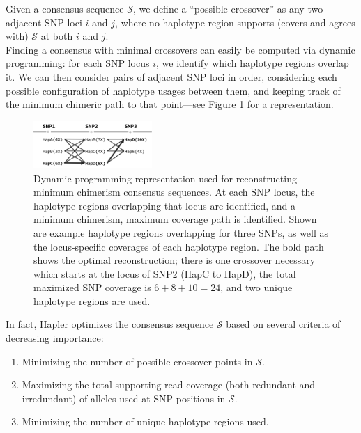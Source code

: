 \documentclass[11pt]{llncs}
\begin{document}
\begin{enumerate}
Given a consensus sequence $\mathcal{S}$, we define a ``possible crossover'' as any two adjacent SNP loci $i$ and $j$, where no haplotype
region supports (covers and agrees with) $\mathcal{S}$ at both $i$ and $j$.\\

Finding a consensus with minimal crossovers can easily be computed via dynamic programming: for each SNP locus $i$, we identify which
haplotype regions overlap it. We can then consider pairs of adjacent SNP loci in order, considering each possible configuration of haplotype usages
between them, and keeping track of the minimum chimeric path to that point---see Figure \ref{recon} for a representation. 

\begin{figure}[!t]
	\centering
		\includegraphics[width=0.4\textwidth]{reconstruction}
	\caption{Dynamic programming representation used for reconstructing minimum chimerism consensus sequences. At each SNP locus, the haplotype
	regions overlapping that locus are identified, and a minimum chimerism, maximum coverage path is identified. Shown are example haplotype
	regions overlapping for three SNPs, as well as the locus-specific coverages of each haplotype region. The bold path shows the optimal reconstruction;
	there is one crossover necessary which starts at the locus of SNP2 (HapC to HapD), the total maximized SNP coverage is $6+8+10=24$, and two unique
haplotype regions are used.}
	\label{recon}
\end{figure}


In fact, Hapler optimizes the consensus sequence $\mathcal{S}$ based on several criteria of decreasing importance:

\begin{enumerate}
	\item Minimizing the number of possible crossover points in $\mathcal{S}$.
	\item Maximizing the total supporting read coverage (both redundant and irredundant) of alleles used at SNP positions in $\mathcal{S}$.
	\item Minimizing the number of unique haplotype regions used.
\end{enumerate}


\end{enumerate}
\end{document}
